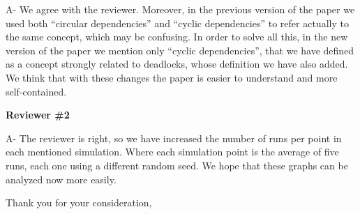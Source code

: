 \documentclass[a4paper,10pt]{letter}
\begin{document}
\begin{letter}

A-  We agree with the reviewer. Moreover, in the previous version of the paper we used both ``circular dependencies'' and ``cyclic dependencies'' to refer actually to the same concept, which may be confusing. In order to solve all this, in the new version of the paper we mention only ``cyclic dependencies'', that we have defined as a concept strongly related to deadlocks, whose definition we have also added. We think that with these changes the paper is easier to understand and more self-contained.


\clearpage

{\bf Reviewer \#2}


A- The reviewer is right, so we have increased the number of runs per point in each mentioned simulation.
Where each simulation point is the average of five runs, each one using a different random seed.
We hope that these graphs can be analyzed now more easily.



\closing{Thank you for your consideration,}


\end{letter}
\end{document}
